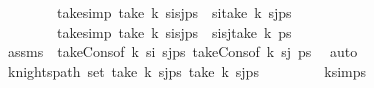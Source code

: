\begin{isabellebody}
\ \ \ \ \ \ \ \ take{\isacharunderscore}{\kern0pt}simp{}{\isacharcolon}{\kern0pt}\ {\isachardoublequoteopen}take\ k\ {\isacharparenleft}{\kern0pt}s\isactrlsub i{\isacharhash}{\kern0pt}s\isactrlsub j{\isacharhash}{\kern0pt}ps{\isacharparenright}{\kern0pt}\ {\isacharequal}{\kern0pt}\ s\isactrlsub i{\isacharhash}{\kern0pt}take\ {\isacharparenleft}{\kern0pt}k{\isacharminus}{\kern0pt}{}{\isacharparenright}{\kern0pt}\ {\isacharparenleft}{\kern0pt}s\isactrlsub j{\isacharhash}{\kern0pt}ps{\isacharparenright}{\kern0pt}{\isachardoublequoteclose}\ \isanewline
\ \ \ \ \ \ \ \ take{\isacharunderscore}{\kern0pt}simp{}{\isacharcolon}{\kern0pt}\ {\isachardoublequoteopen}take\ k\ {\isacharparenleft}{\kern0pt}s\isactrlsub i{\isacharhash}{\kern0pt}s\isactrlsub j{\isacharhash}{\kern0pt}ps{\isacharparenright}{\kern0pt}\ {\isacharequal}{\kern0pt}\ s\isactrlsub i{\isacharhash}{\kern0pt}s\isactrlsub j{\isacharhash}{\kern0pt}take\ {\isacharparenleft}{\kern0pt}k{\isacharminus}{\kern0pt}{}{\isacharminus}{\kern0pt}{}{\isacharparenright}{\kern0pt}\ ps{\isachardoublequoteclose}\isanewline
\ \ \ \ \ \ \isamarkupfalse%
\ assms\ {}\ take{\isacharunderscore}{\kern0pt}Cons{\isacharprime}{\kern0pt}{\isacharbrackleft}{\kern0pt}of\ k\ s\isactrlsub i\ {\isachardoublequoteopen}s\isactrlsub j{\isacharhash}{\kern0pt}ps{\isachardoublequoteclose}{\isacharbrackright}{\kern0pt}\ take{\isacharunderscore}{\kern0pt}Cons{\isacharprime}{\kern0pt}{\isacharbrackleft}{\kern0pt}of\ {\isachardoublequoteopen}k{\isacharminus}{\kern0pt}{}{\isachardoublequoteclose}\ s\isactrlsub j\ ps{\isacharbrackright}{\kern0pt}\ \isamarkupfalse%
\ auto\isanewline
\ \ \ \ \isamarkupfalse%
\ \isamarkupfalse%
\ {\isachardoublequoteopen}knights{\isacharunderscore}{\kern0pt}path\ {\isacharparenleft}{\kern0pt}set\ {\isacharparenleft}{\kern0pt}take\ {\isacharparenleft}{\kern0pt}k{\isacharminus}{\kern0pt}{}{\isacharparenright}{\kern0pt}\ {\isacharparenleft}{\kern0pt}s\isactrlsub j{\isacharhash}{\kern0pt}ps{\isacharparenright}{\kern0pt}{\isacharparenright}{\kern0pt}{\isacharparenright}{\kern0pt}\ {\isacharparenleft}{\kern0pt}take\ {\isacharparenleft}{\kern0pt}k{\isacharminus}{\kern0pt}{}{\isacharparenright}{\kern0pt}\ {\isacharparenleft}{\kern0pt}s\isactrlsub j{\isacharhash}{\kern0pt}ps{\isacharparenright}{\kern0pt}{\isacharparenright}{\kern0pt}{\isachardoublequoteclose}\isanewline
\ \ \ \ \ \ \isamarkupfalse%
\ {}\ k{\isacharunderscore}{\kern0pt}simps\ \isamarkupfalse%

\end{isabellebody}
